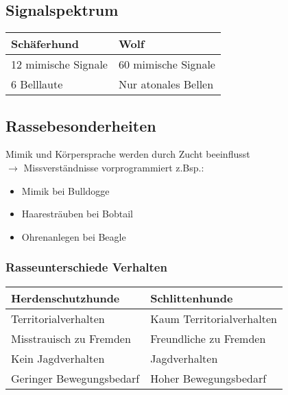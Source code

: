     \subsection{Signalspektrum}
        \begin{tabular}{l|l}
            \textbf{Schäferhund}    & \textbf{Wolf} \\
            \hline
            12 mimische Signale     & 60 mimische Signale \\
            6 Belllaute             & Nur atonales Bellen \\
        \end{tabular}

    \subsection{Rassebesonderheiten}
        Mimik und Körpersprache werden durch Zucht beeinflusst \\
        $\rightarrow$ Missverständnisse vorprogrammiert z.Bsp.:
        \begin{itemize}
            \item Mimik bei Bulldogge
            \item Haaresträuben bei Bobtail
            \item Ohrenanlegen bei Beagle
        \end{itemize}

        \subsubsection{Rasseunterschiede Verhalten}
            \begin{tabular}{l|l}
                \textbf{Herdenschutzhunde}  & \textbf{Schlittenhunde} \\
                \hline
                Territorialverhalten        & Kaum Territorialverhalten \\
                Misstrauisch zu Fremden     & Freundliche zu Fremden \\
                Kein Jagdverhalten          & Jagdverhalten \\
                Geringer Bewegungsbedarf    & Hoher Bewegungsbedarf \\
            \end{tabular}

